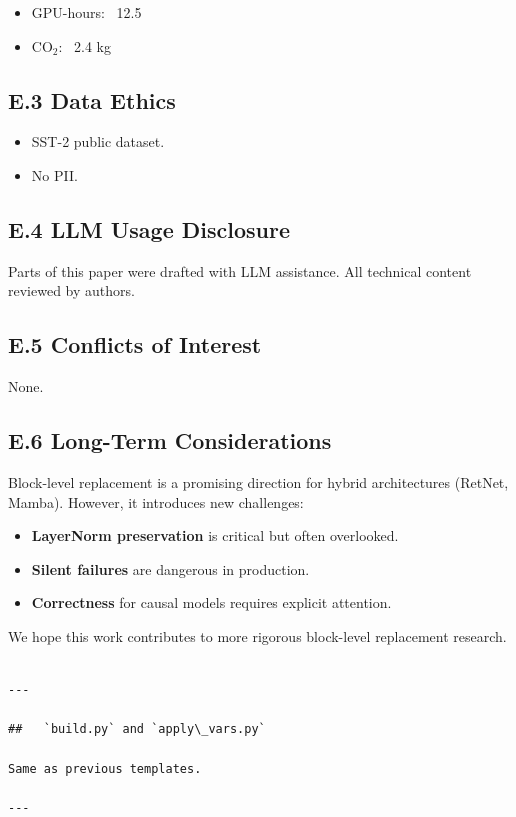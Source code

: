 \begin{itemize}
\item GPU-hours: ~12.5
\item CO$_2$: ~2.4 kg

\end{itemize}
\subsection{E.3 Data Ethics}

\begin{itemize}
\item SST-2 public dataset.
\item No PII.

\end{itemize}
\subsection{E.4 LLM Usage Disclosure}

Parts of this paper were drafted with LLM assistance. All technical content 
reviewed by authors.

\subsection{E.5 Conflicts of Interest}

None.

\subsection{E.6 Long-Term Considerations}

Block-level replacement is a promising direction for hybrid architectures 
(RetNet, Mamba). However, it introduces new challenges:

\begin{itemize}
\item \textbf{LayerNorm preservation} is critical but often overlooked.
\item \textbf{Silent failures} are dangerous in production.
\item \textbf{Correctness} for causal models requires explicit attention.

\end{itemize}
We hope this work contributes to more rigorous block-level replacement 
research.
\begin{lstlisting}

---

##   `build.py` and `apply\_vars.py`

Same as previous templates.

---
\end{lstlisting}


